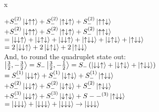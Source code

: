 x\documentclass[12pt]{article}
\begin{document}
\begin{enumerate}[label=\alph*)]
\hspace*{5.5em}$ + S_-^{(2)}\ket{\downarrow\uparrow\uparrow} + S_-^{(2)}\ket{\uparrow\downarrow\uparrow} + S_-^{(2)}\ket{\uparrow\uparrow\downarrow}$\vspace{0.5em}\\
\hspace*{5.5em}$ + S_-^{(2)}\ket{\downarrow\uparrow\uparrow} + S_-^{(2)}\ket{\uparrow\downarrow\uparrow} + S_-^{(2)}\ket{\uparrow\uparrow\downarrow}$\vspace{0.5em}\\
\hspace*{3.5em}$ = \ket{\downarrow\downarrow\uparrow} + \ket{\downarrow\uparrow\downarrow} + \ket{\downarrow\downarrow\uparrow} + \ket{\uparrow\downarrow\downarrow} + \ket{\downarrow\uparrow\downarrow} + \ket{\uparrow\downarrow\downarrow}$\vspace{0.5em}\\
\hspace*{3.5em}$= 2\ket{\downarrow\downarrow\uparrow} + 2\ket{\downarrow\uparrow\downarrow} + 2 \ket{\uparrow\downarrow\downarrow}$\vspace{0.5em}\\
And, to round the quadruplet state out:\vspace{0.5em}\\
$\ket{\frac{3}{2}, -\frac{3}{2}} = S_-\ket{\frac{3}{2}, -\frac{1}{2}} = S_-\left(\ket{\downarrow\downarrow\uparrow} + \ket{\downarrow\uparrow\downarrow} + \ket{\uparrow\downarrow\downarrow}\right)$\vspace{0.5em}\\
\hspace*{3.5em}$ = S_-^{(1)}\ket{\downarrow\downarrow\uparrow} + S_-^{(1)}\ket{\downarrow\uparrow\downarrow} + S_-^{(1)}\ket{\uparrow\downarrow\downarrow}$\vspace{0.5em}\\
\hspace*{5.5em}$ + S_-^{(2)}\ket{\downarrow\downarrow\uparrow} + S_-^{(2)}\ket{\downarrow\uparrow\downarrow} + S_-^{(2)}\ket{\uparrow\downarrow\downarrow}$\vspace{0.5em}\\
\hspace*{5.5em}$ + S_-^{(3)}\ket{\downarrow\downarrow\uparrow} + S_-^{(3)}\ket{\downarrow\uparrow\downarrow} + S--^{(3)}\ket{\uparrow\downarrow\downarrow}$\vspace{0.5em}\\
\hspace*{3.5em}$=\ket{\downarrow\downarrow\downarrow} + \ket{\downarrow\downarrow\downarrow} + \ket{\downarrow\downarrow\downarrow} \rightarrow \ket{\downarrow\downarrow\downarrow}$\vspace{1.5em}\\

\end{enumerate}
\end{document}
